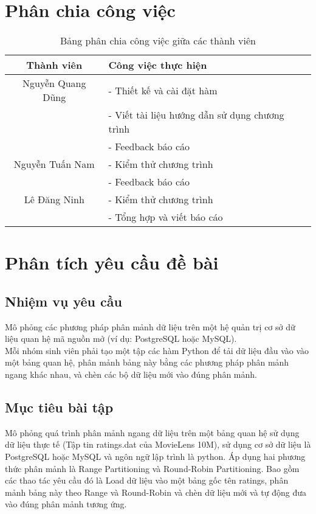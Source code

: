 \documentclass[14pt]{extarticle}
\begin{document}
\section{Phân chia công việc}
\begin{table}[H]
    \centering
    \begin{tabular}{|c|p{8cm}|}
        \hline
        \textbf{Thành viên} & \textbf{Công việc thực hiện} \\
        \hline
        Nguyễn Quang Dũng & 
        - Thiết kế và cài đặt hàm  \\
        & - Viết tài liệu hướng dẫn sử dụng chương trình \\
        & - Feedback báo cáo\\
        \hline
        Nguyễn Tuấn Nam & 
         - Kiểm thử chương trình\\&
         - Feedback báo cáo \\
        \hline
        Lê Đăng Ninh & 
        - Kiểm thử chương trình\\&
        - Tổng hợp và viết báo cáo\\
        \hline
    \end{tabular}
    \caption{Bảng phân chia công việc giữa các thành viên}
\end{table}
\newpage
\section{Phân tích yêu cầu đề bài}
\subsection{Nhiệm vụ yêu cầu}
Mô phỏng các phương pháp phân mảnh dữ liệu trên một hệ quản trị cơ sở dữ liệu quan hệ mã nguồn mở (ví dụ: PostgreSQL hoặc MySQL).\\
Mỗi nhóm sinh viên phải tạo một tập các hàm Python để tải dữ liệu đầu vào vào một bảng quan hệ, phân mảnh bảng này bằng các phương pháp phân mảnh ngang khác nhau, và chèn các bộ dữ liệu mới vào đúng phân mảnh.
\subsection{Mục tiêu bài tập}
Mô phỏng quá trình phân mảnh ngang dữ liệu trên một bảng quan hệ sử dụng dữ liệu thực tế (Tập tin ratings.dat của MovieLens 10M),	sử dụng cơ sở dữ liệu là PostgreSQL hoặc MySQL và ngôn ngữ lập trình là python. Áp dụng hai phương thức phân mảnh là Range Partitioning và Round-Robin Partitioning. Bao gồm các thao tác yêu cầu đó là Load dữ liệu vào một bảng gốc tên ratings, phân mảnh bảng này theo Range và Round-Robin và chèn dữ liệu mới và tự động đưa vào đúng phân mảnh tương ứng.
\end{document}
